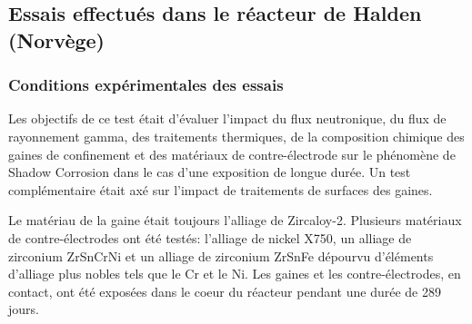 \begin{refsection}


        


    \subsection{Essais effectués dans le réacteur de Halden (Norvège)}\label{subsec:halden}

    \subsubsection{Conditions expérimentales des essais}
        Les objectifs de ce test était d'évaluer l’impact du flux
        neutronique, du flux de rayonnement gamma, des traitements thermiques, de la
        composition chimique des gaines de confinement et des matériaux de
        contre-électrode sur le phénomène de Shadow Corrosion dans le cas d'une exposition de longue durée. Un test
        complémentaire était axé sur l’impact de traitements de surfaces des
        gaines.
	
        Le matériau de la gaine était toujours l’alliage de Zircaloy-2. Plusieurs
        matériaux de contre-électrodes ont été testés: l’alliage de nickel X750, un alliage de
        zirconium ZrSnCrNi et un alliage de zirconium ZrSnFe dépourvu d’éléments
        d’alliage plus nobles tels que le Cr et le Ni. Les gaines et les
        contre-électrodes, en contact, ont été exposées dans le coeur du réacteur pendant
        une durée de 289 jours. 


\end{refsection}
